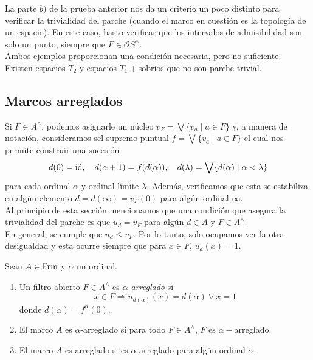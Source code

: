 La parte $b)$ de la prueba anterior nos da un criterio un poco distinto para verificar la trivialidad del parche (cuando el marco en cuestión es la topología de un espacio). En este caso, basto verificar que los intervalos de admisibilidad son solo un punto, siempre que $F\in \mathcal{O}S^\wedge$. \\

Ambos ejemplos proporcionan una condición necesaria, pero no suficiente. Existen espacios $T_2$ y espacios $T_1+$sobrios que no son parche trivial.

\subsection{Marcos arreglados}

Si $F\in A^\wedge$, podemos asignarle un núcleo $v_F=\bigvee \{v_a\mid a\in F\}$ y, a manera de notación, consideramos sel supremo puntual $f=\dot{\bigvee}\{v_a\mid a\in F\}$ el cual nos permite construir una sucesión 
\[
d(0)=\mathrm{id}, \quad d(\alpha +1)=f(d(\alpha)),\quad d(\lambda)=\bigvee\{d(\alpha)\mid \alpha <\lambda\}
\]
para cada ordinal $\alpha$ y ordinal límite $\lambda$. Además, verificamos que esta se estabiliza en algún elemento $d=d(\infty)=v_F(0)$ para algún ordinal $\infty$.\\

Al principio de esta sección mencionamos que una condición que asegura la trivialidad del parche es que $u_d=v_F$ para algún $d\in A$ y $F\in A^\wedge$.\\

En general, se cumple que $u_d\leq v_F$. Por lo tanto, solo ocupamos ver la otra desigualdad y esta ocurre siempre que para $x\in F$, $u_d(x)=1$. 

\begin{dfn}\label{Definición8.2.1}
    Sean $A\in \mathrm{Frm}$ y $\alpha$ un ordinal. 
    \begin{enumerate}
        \item Un filtro abierto $F\in A^\wedge$ es \emph{$\alpha$-arreglado} si 
    \[
    x\in F\Rightarrow u_{d(\alpha)}(x)=d(\alpha)\vee x=1
    \]
    donde $d(\alpha)=f^\alpha(0)$.
    
    \item El marco $A$ es $\alpha$-arreglado si para todo $F\in A^\wedge$, $F$ es $\alpha-$arreglado.

    \item El marco $A$ es arreglado si es $\alpha$-arreglado para algún ordinal $\alpha$.
    \end{enumerate}
\end{dfn}

